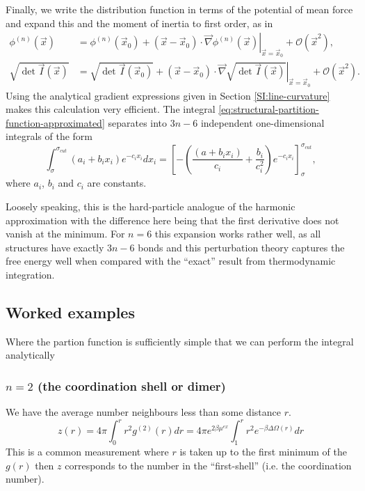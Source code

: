 \documentclass[11pt,twoside]{report}
\begin{document}
Finally, we write the distribution function in terms of the potential of mean force and expand this and the moment of inertia to first order, as in
\begin{align}
  \phi^{(n)}(\vec{x}) &=
  \phi^{(n)}(\vec{x}_0) +
  (\vec{x} - \vec{x}_0) \cdot
  \left. \vec{\nabla} \phi^{(n)}(\vec{x}) \right|_{\vec{x} = \vec{x}_0} +
  \mathcal{O}(\vec{x}^2), \\
  \sqrt{\det{\vec{I}(\vec{x})}} &=
  \sqrt{\det{\vec{I}(\vec{x}_0)}} +
  (\vec{x} - \vec{x}_0) \cdot
  \left. \vec{\nabla} \sqrt{\det{\vec{I}(\vec{x})}} \right|_{\vec{x} = \vec{x}_0} +
  \mathcal{O}(\vec{x}^2).
\end{align}
Using the analytical gradient expressions given in Section \ref{SI:line-curvature} makes this calculation very efficient.
The integral \eqref{eq:structural-partition-function-approximated} separates into $3n-6$ independent one-dimensional integrals of the form
\begin{equation*}
  \int_\sigma^{\sigma_{cut}} (a_i + b_i x_i) e^{-c_i x_i} dx_i
  = \left[
    - \left(
    \frac{(a + b_i x_i)}{c_i} + \frac{b_i}{c_i^2} \right) e^{-c_i x_i}
  \right]_\sigma^{\sigma_{cut}},
\end{equation*}
where $a_i$, $b_i$ and $c_i$ are constants.

Loosely speaking, this is the hard-particle analogue of the harmonic approximation with the difference here being that the first derivative does not vanish at the minimum.
For $n=6$ this expansion works rather well, as all structures have exactly $3n-6$ bonds and this perturbation theory captures the free energy well when compared with the ``exact'' result from thermodynamic integration.

\subsection{Worked examples}
Where the partion function is sufficiently simple that we can perform the integral analytically

\subsubsection{$n = 2$ (the coordination shell or dimer)}

We have the average number neighbours less than some distance $r$.
\begin{equation}
  z(r) = 4\pi \int_0^r r^2 g^{(2)}(r) dr
  = 4\pi e^{2\beta \mu^{ex}} \int_1^r r^2 e^{-\beta \Delta \Omega(r)} dr
\end{equation}
This is a common measurement where $r$ is taken up to the first minimum of the $g(r)$ then $z$ corresponds to the number in the ``first-shell'' (i.e. the coordination number).
\end{document}
